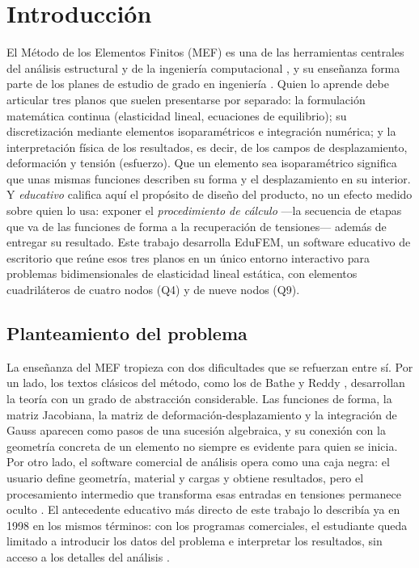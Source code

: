 \chapter*{Introducción}

El Método de los Elementos Finitos (MEF) es una de las herramientas centrales del análisis estructural y de la ingeniería computacional \autocite{zienkiewicz2013fem,cook2002concepts}, y su enseñanza forma parte de los planes de estudio de grado en ingeniería \autocite[p.~1160]{perezsantiago2023fem}. Quien lo aprende debe articular tres planos que suelen presentarse por separado: la formulación matemática continua (elasticidad lineal, ecuaciones de equilibrio); su discretización mediante elementos isoparamétricos e integración numérica; y la interpretación física de los resultados, es decir, de los campos de desplazamiento, deformación y tensión (esfuerzo). Que un elemento sea isoparamétrico significa que unas mismas funciones describen su forma y el desplazamiento en su interior. Y \emph{educativo} califica aquí el propósito de diseño del producto, no un efecto medido sobre quien lo usa: exponer el \emph{procedimiento de cálculo} ---la secuencia de etapas que va de las funciones de forma a la recuperación de tensiones--- además de entregar su resultado. Este trabajo desarrolla EduFEM, un software educativo de escritorio que reúne esos tres planos en un único entorno interactivo para problemas bidimensionales de elasticidad lineal estática, con elementos cuadriláteros de cuatro nodos (Q4) y de nueve nodos (Q9).

\section*{Planteamiento del problema}

La enseñanza del MEF tropieza con dos dificultades que se refuerzan entre sí. Por un lado, los textos clásicos del método, como los de Bathe y Reddy \autocite{bathe2014fem,reddy2006introduction}, desarrollan la teoría con un grado de abstracción considerable. Las funciones de forma, la matriz Jacobiana, la matriz de deformación-desplazamiento y la integración de Gauss aparecen como pasos de una sucesión algebraica, y su conexión con la geometría concreta de un elemento no siempre es evidente para quien se inicia. Por otro lado, el software comercial de análisis opera como una caja negra: el usuario define geometría, material y cargas y obtiene resultados, pero el procesamiento intermedio que transforma esas entradas en tensiones permanece oculto \autocite[p.~1160]{perezsantiago2023fem}. El antecedente educativo más directo de este trabajo lo describía ya en 1998 en los mismos términos: con los programas comerciales, el estudiante queda limitado a introducir los datos del problema e interpretar los resultados, sin acceso a los detalles del análisis \autocite[p.~246]{suarez1998edelas2d}.

